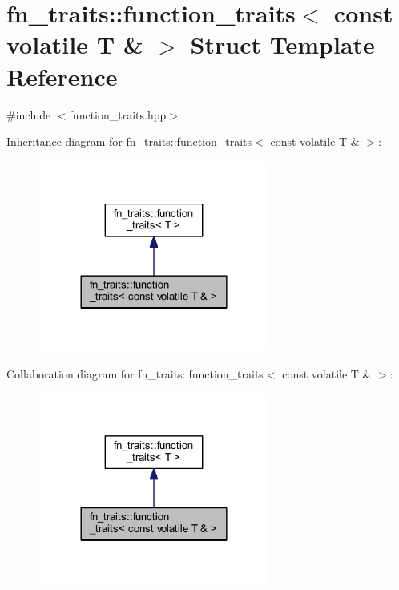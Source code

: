\hypertarget{structfn__traits_1_1function__traits_3_01const_01volatile_01_t_01_6_01_4}{}\section{fn\+\_\+traits\+:\+:function\+\_\+traits$<$ const volatile T \& $>$ Struct Template Reference}
\label{structfn__traits_1_1function__traits_3_01const_01volatile_01_t_01_6_01_4}


{\ttfamily \#include $<$function\+\_\+traits.\+hpp$>$}



Inheritance diagram for fn\+\_\+traits\+:\+:function\+\_\+traits$<$ const volatile T \& $>$\+:\nopagebreak
\begin{figure}[H]
\begin{center}
\leavevmode
\includegraphics[width=216pt]{de/dbb/structfn__traits_1_1function__traits_3_01const_01volatile_01_t_01_6_01_4__inherit__graph}
\end{center}
\end{figure}


Collaboration diagram for fn\+\_\+traits\+:\+:function\+\_\+traits$<$ const volatile T \& $>$\+:\nopagebreak
\begin{figure}[H]
\begin{center}
\leavevmode
\includegraphics[width=216pt]{d6/df7/structfn__traits_1_1function__traits_3_01const_01volatile_01_t_01_6_01_4__coll__graph}
\end{center}
\end{figure}


